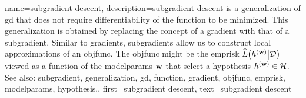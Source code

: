 {name={subgradient descent}, 
	description={\Gls{subgradient} 
		descent is a \gls{generalization} of \gls{gd} that does not require differentiability of the 
		\gls{function} to be minimized. This generalization is obtained by replacing the concept 
		of a \gls{gradient} with that of a \gls{subgradient}. Similar to \glspl{gradient}, \glspl{subgradient} 
		allow us to construct local approximations of an \gls{objfunc}. The \gls{objfunc} 
		might be the \gls{emprisk} $\widehat{L}\big( h^{({\bf w})} \big| \mathcal{D} \big)$ viewed 
		as a \gls{function} of the \glspl{modelparam} ${\bf w}$ that select a \gls{hypothesis} $h^{({\bf w})} \in \mathcal{H}$.
				\\
		See also: \gls{subgradient}, \gls{generalization}, \gls{gd}, \gls{function}, \gls{gradient}, \gls{objfunc}, \gls{emprisk}, \glspl{modelparam}, \gls{hypothesis}.},
	first={subgradient descent},
	text={subgradient descent} 
}
	
